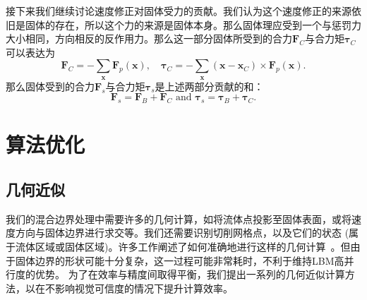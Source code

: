 接下来我们继续讨论速度修正对固体受力的贡献。我们认为这个速度修正的来源依旧是固体的存在，所以这个力的来源是固体本身。那么固体理应受到一个与惩罚力大小相同，方向相反的反作用力。那么这一部分固体所受到的合力$\bm{F}_{C}$与合力矩$\bm{\tau}_{C}$可以表达为
\begin{equation}
\bm{F}_{C} = - \sum_{\bm{x}}\bm{F}_p(\bm{x}), \quad \bm{\tau}_{C} = - \sum_{\bm{x}} (\bm{x}-\bm{x}_{C})\times\bm{F}_p(\bm{x}).
\end{equation}
那么固体受到的合力$\bm{F}_s$与合力矩$\bm{\tau}_s$是上述两部分贡献的和：
\begin{equation}
\bm{F}_s = \bm{F}_{B} + \bm{F}_{C} \text{ and } \bm{\tau}_s = \bm{\tau}_{B} + \bm{\tau}_{C}.
\end{equation}

\section{算法优化}
\subsection{几何近似}
我们的混合边界处理中需要许多的几何计算，如将流体点投影至固体表面，或将速度方向与固体边界进行求交等。我们还需要识别切削网格点，以及它们的状态 (属于流体区域或固体区域)。许多工作阐述了如何准确地进行这样的几何计算~\citep{Azevedo-2016,Robinson:2009}。但由于固体边界的形状可能十分复杂，这一过程可能非常耗时，不利于维持LBM高并行度的优势。
为了在效率与精度间取得平衡，我们提出一系列的几何近似计算方法，以在不影响视觉可信度的情况下提升计算效率。

